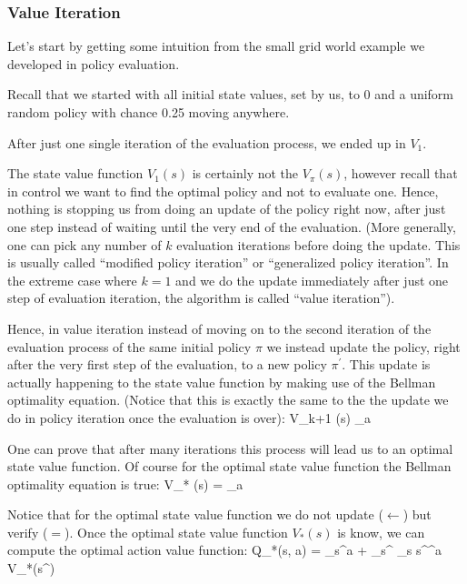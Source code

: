 \subsubsection{Value Iteration}

Let's start by getting some intuition from the small grid world example we developed in policy evaluation.

\be
Recall that we started with all initial state values, set by us, to 0 and a uniform random policy with chance 0.25
moving anywhere.


After just one single iteration of the evaluation process, we ended up in $V_1 $.


The state value function $V_1(s)$ is certainly not the $V_{\pi}(s)$, however recall that in control we want to find
the optimal policy and not to evaluate one. Hence, nothing is stopping us from doing an update of the policy right
now, after just one step instead of waiting until the very end of the evaluation. (More generally, one can pick any
number of $k$ evaluation iterations before doing the update. This is usually called ``modified policy iteration'' or
``generalized policy iteration''. In the extreme case where $k=1$ and we do the update immediately after just one step
of evaluation iteration, the algorithm is called ``value iteration'').
\ee

Hence, in value iteration instead of moving on to the second iteration of the evaluation process of the same initial
policy $\pi$ we instead update the policy, right after the very first step of the evaluation, to a new policy
$\pi^\prime$. This update is actually happening to the state value function by making use of the Bellman optimality
equation. (Notice that this is exactly the same to the the update we do in policy iteration once the evaluation is
over):
\bse
V_{k+1} (s) \gets \max_{a} 
\ese

One can prove that after many iterations this process will lead us to an optimal state value function. Of course for
the optimal state value function the Bellman optimality equation is true:
\bse
V_{*} (s) = \max_{a} 
\ese

Notice that for the optimal state value function we do not update ($\gets$) but verify ($=$). Once the optimal state
value function $V_*(s)$ is know, we can compute the optimal action value function:
\bse
Q_{*}(s, a) = _{s}^{a} + \gamma \sum_{s^{\prime}} _{s s^\prime}^{a} V_{*}(s^\prime)
\ese

